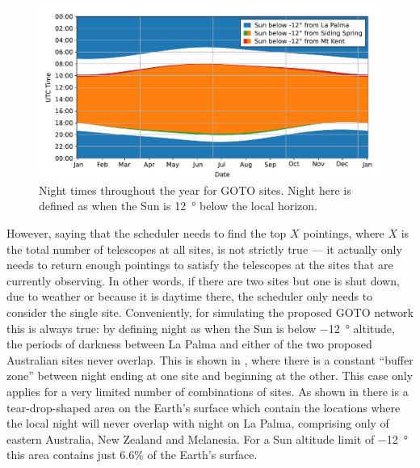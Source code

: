 \begin{colsection}
\newpage

\begin{figure}[t]
    \begin{center}
        \includegraphics[width=\linewidth]{images/nights.pdf}
    \end{center}
    \caption[Night times throughout the year for GOTO sites]{
        Night times throughout the year for GOTO sites. Night here is defined as when the Sun is \SI{12}{\degree} below the local horizon.
    }\label{fig:nights}
\end{figure}

However, saying that the scheduler needs to find the top $X$ pointings, where $X$ is the total number of telescopes at all sites, is not strictly true --- it actually only needs to return enough pointings to satisfy the telescopes at the sites that are currently observing. In other words, if there are two sites but one is shut down, due to weather or because it is daytime there, the scheduler only needs to consider the single site. Conveniently, for simulating the proposed GOTO network this is always true: by defining night as when the Sun is below \SI{-12}{\degree} altitude, the periods of darkness between La Palma and either of the two proposed Australian sites never overlap. This is shown in , where there is a constant ``buffer zone'' between night ending at one site and beginning at the other. This case only applies for a very limited number of combinations of sites. As shown in  there is a tear-drop-shaped area on the Earth's surface which contain the locations where the local night will never overlap with night on La Palma, comprising only of eastern Australia, New Zealand and Melanesia. For a Sun altitude limit of \SI{-12}{\degree} this area contains just $6.6 \%$ of the Earth's surface.


\end{colsection}
